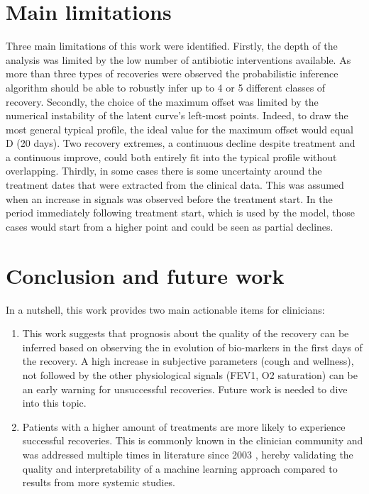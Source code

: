 \section{Main limitations}
Three main limitations of this work were identified. Firstly, the depth of the analysis was limited by the low number of antibiotic interventions available. As more than three types of recoveries were observed the probabilistic inference algorithm should be able to robustly infer up to 4 or 5 different classes of recovery. Secondly, the choice of the maximum offset was limited by the numerical instability of the latent curve's left-most points. Indeed, to draw the most general typical profile, the ideal value for the maximum offset would equal D (20 days). Two recovery extremes, a continuous decline despite treatment and a continuous improve, could both entirely fit into the typical profile without overlapping. Thirdly, in some cases there is some uncertainty around the treatment dates that were extracted from the clinical data. This was assumed when an increase in signals was observed before the treatment start. In the period immediately following treatment start, which is used by the model, those cases would start from a higher point and could be seen as partial declines.


\section{Conclusion and future work}
In a nutshell, this work provides two main actionable items for clinicians:
\begin{enumerate}
    \item This work suggests that prognosis about the quality of the recovery can be inferred based on observing the in evolution of bio-markers in the first days of the recovery. A high increase in subjective parameters (cough and wellness), not followed by the other physiological signals (FEV1, O2 saturation) can be an early warning for unsuccessful recoveries. Future work is needed to dive into this topic.
    \item Patients with a higher amount of treatments are more likely to experience successful recoveries. This is commonly known in the clinician community and was addressed multiple times in literature since 2003 \cite{giron_2021}, hereby validating the quality and interpretability of a machine learning approach compared to results from more systemic studies.
\end{enumerate}

